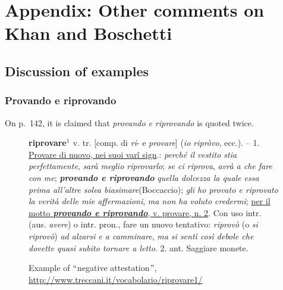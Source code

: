 \documentclass[10pt]{article}
\begin{document}








\newpage
\section*{Appendix: Other comments on Khan and Boschetti }
\subsection*{Discussion of examples}



\subsubsection*{Provando e riprovando}



 On p.~142, it is claimed that \textit{provando e riprovando} is quoted twice. \par


\begin{figure}[H]
 \textbf{\textcolor[HTML]{3E3F3E}{riprovare$^1$ }}\textcolor[HTML]{3E3F3E}{ v. tr. [comp. di \textit{ri}- e \textit{provare}] (\textit{io ripròvo}, ecc.). – 1. \uline{Provare di nuovo, nei suoi varî sign}.: \textit{perché il vestito stia perfettamente}, \textit{sarà meglio riprovarlo}; \textit{se ci riprova}, \textit{avrà a che fare con me}; \textbf{\textit{provando e riprovando}}\textit{ quella dolcezza la quale essa prima all’altre solea biasimare}(Boccaccio); \textit{gli ho provato e riprovato la verità delle mie affermazioni}, \textit{ma non ha voluto credermi}; \uline{per il motto \textbf{\textit{provando e riprovando}}, v. provare, n. 2}. Con uso intr. (aus. \textit{avere}) o intr. pron., fare un nuovo tentativo: \textit{riprovò} (o \textit{si riprovò}) \textit{ad alzarsi e a camminare}, \textit{ma si sentì così debole che dovette quasi subito tornare a letto}. 2. ant. Saggiare monete.}\par

 \caption{Example of $``$negative attestation$"$, \textcolor[HTML]{3E3F3E}{\href{http://www.treccani.it/vocabolario/riprovare1/}{\uline{http://www.treccani.it/vocabolario/riprovare1/}}}}

\end{figure}
\end{document}
